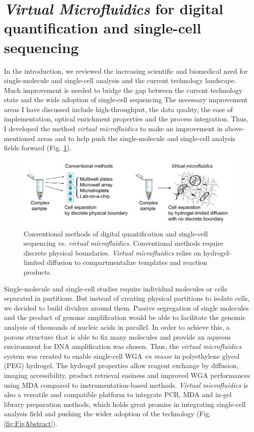 \section{\textbf{\textit{Virtual Microfluidics}} for
digital quantification and single-cell sequencing}
In the introduction, we reviewed the increasing scientific and biomedical need for single-molecule and single-cell analysis and the current technology landscape. Much improvement is needed to bridge the gap between the current technology state and the wide adoption of single-cell sequencing The necessary improvement areas I have discussed include high-throughput, the data quality, the ease of implementation, optical enrichment properties and the process integration. Thus, I developed the method \textit{virtual microfluidics} to make an improvement in above-mentioned areas and to help push the single-molecule and single-cell analysis fields forward (Fig. \ref{fig:VM1}). 

\begin{figure}[ht!]
\centering
\includegraphics[keepaspectratio,width=1\textwidth]{./figures/Thesis-20.png}
\caption[Conventional methods of digital quantification and single-cell sequencing vs. \textit{virtual microfluidics}]{Conventional methods of digital quantification and single-cell sequencing vs. \textit{virtual microfluidics}. Conventional methods require discrete physical boundaries. \textit{Virtual microfluidics} relies on hydrogel-limited diffusion to compartmentalize templates and reaction products.}
\label{fig:VM1}
\end{figure}

Single-molecule and single-cell studies require individual molecules or cells separated in partitions. But instead of creating physical partitions to isolate cells, we decided to build  dividers around them. Passive segregation of single molecules and the product of genome amplification would be able to facilitate the genomic analysis of thousands of nucleic acids in parallel. In order to achieve this, a porous structure that is able to fix many molecules and provide an aqueous environment for DNA amplification was chosen. Thus, the \textit{virtual microfluidics} system was created to enable single-cell WGA \textit{en masse} in polyethylene glycol (PEG) hydrogel. The hydrogel properties allow reagent exchange by diffusion, imaging accessibility, product retrieval easiness and improved WGA performances using MDA compared to instrumentation-based methods. \textit{Virtual microfluidics} is also a versatile and compatible platform to integrate PCR, MDA and in-gel library preparation methods, which holds great promise in integrating single-cell analysis field and pushing the wider adoption of the technology (Fig. \ref{fig:FigAbstract}). 

